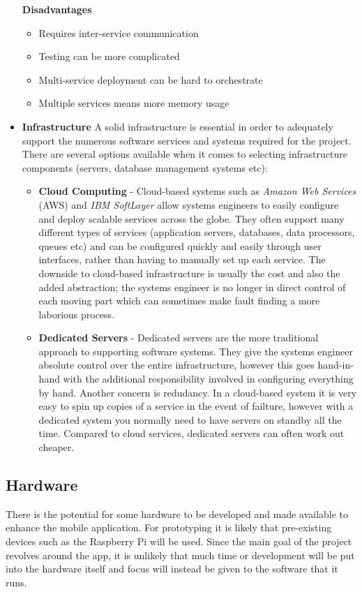 \begin{itemize}
    \textbf{Disadvantages}
    \begin{itemize}
      \item Requires inter-service communication
      \item Testing can be more complicated
      \item Multi-service deployment can be hard to orchestrate
      \item Multiple services means more memory usage
    \end{itemize}
  \item \textbf{Infrastructure}
    A solid infrastructure is essential in order to adequately support the numerous software services and systems required for the project. There are several options available when it comes to selecting infrastructure components (servers, database management systems etc):
    \begin{itemize}
      \item \textbf{Cloud Computing} - 
        Cloud-based systems such as \emph{Amazon Web Services} (AWS) and \emph{IBM SoftLayer} allow systems engineers to easily configure and deploy scalable services across the globe. They often support many different types of services (application servers, databases, data processors, queues etc) and can be configured quickly and easily through user interfaces, rather than having to manually set up each service. The downside to cloud-based infrastructure is usually the cost and also the added abstraction; the systems engineer is no longer in direct control of each moving part which can sometimes make fault finding a more laborious process.
      \item \textbf{Dedicated Servers} - 
        Dedicated servers are the more traditional approach to supporting software systems. They give the systems engineer absolute control over the entire infrastructure, however this goes hand-in-hand with the additional responsibility involved in configuring everything by hand. Another concern is redudancy. In a cloud-based system it is very easy to spin up copies of a service in the event of failture, however with a dedicated system you normally need to have servers on standby all the time. Compared to cloud services, dedicated servers can often work out cheaper.
    \end{itemize}
\end{itemize}


\subsection{Hardware}

There is the potential for some hardware to be developed and made available to enhance the mobile application. For prototyping it is likely that pre-existing devices such as the Raspberry Pi will be used. Since the main goal of the project revolves around the app, it is unlikely that much time or development will be put into the hardware itself and focus will instead be given to the software that it runs.